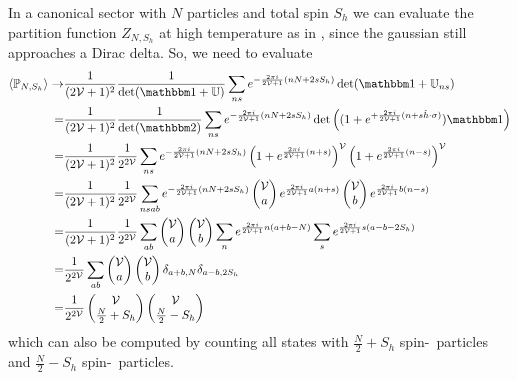 In a canonical sector with $N$ particles and total spin $S_h$ we can evaluate the partition function $Z_{N,S_h}$ at high temperature as in , since the gaussian still approaches a Dirac delta.
So, we need to evaluate
\begin{align}
    \expectation{\PP_{N,S_h}}
    \goesto&
    \oneover{(2\Volume+1)^2}\oneover{\det(\one+\UU)} \sum_{ns} e^{-\frac{2\pi i}{2\Volume+1}(nN+2sS_h)} \det(\one+\UU_{ns})
    \nonumber\\
    =&
    \oneover{(2\Volume+1)^2}\oneover{\det(\two)} \sum_{ns} e^{-\frac{2\pi i}{2\Volume+1}(nN+2sS_h)} \det\left((1+e^{+\frac{2\pi i}{2\Volume+1}(n + s \hat{h}\cdot\sigma)})\one\right)
    \nonumber\\
    =&
    \oneover{(2\Volume+1)^2}\oneover{2^{2\Volume}} \sum_{ns} e^{-\frac{2\pi i}{2\Volume+1}(nN+2sS_h)} \left(1+e^{\frac{2\pi i}{2\Volume+1}(n+s)}\right)^\Volume \left(1+e^{\frac{2\pi i}{2\Volume+1}(n-s)}\right)^\Volume 
    \nonumber\\
    =&
    \oneover{(2\Volume+1)^2}\oneover{2^{2\Volume}} \sum_{nsab} e^{-\frac{2\pi i}{2\Volume+1}(nN+2sS_h)} \begin{pmatrix} \Volume \\ a \end{pmatrix} e^{\frac{2\pi i}{2\Volume+1} a (n+s)} \begin{pmatrix} \Volume \\ b \end{pmatrix} e^{\frac{2\pi i}{2\Volume+1} b (n-s)}
    \nonumber\\
    =&
    \oneover{(2\Volume+1)^2}\oneover{2^{2\Volume}} \sum_{ab} \begin{pmatrix} \Volume \\ a \end{pmatrix} \begin{pmatrix} \Volume \\ b \end{pmatrix} \sum_n e^{\frac{2\pi i}{2\Volume+1}n(a+b-N)} \sum_s e^{\frac{2\pi i}{2\Volume+1}s(a-b-2S_h)}
    \nonumber\\
    =&
    \oneover{2^{2\Volume}} \sum_{ab} \begin{pmatrix} \Volume \\ a \end{pmatrix} \begin{pmatrix} \Volume \\ b \end{pmatrix} \delta_{a+b,N} \delta_{a-b,2S_h}
    \nonumber\\
    =&
    \oneover{2^{2\Volume}} \begin{pmatrix} \Volume \\ \frac{N}{2} + S_h \end{pmatrix} \begin{pmatrix} \Volume \\ \frac{N}{2}-S_h \end{pmatrix}
    \label{eq:canonical infinite-temperature partition function}
\end{align}
which can also be computed by counting all states with $\frac{N}{2} + S_h$ spin-\up\ particles and $\frac{N}{2} - S_h$ spin-\dn\ particles.
